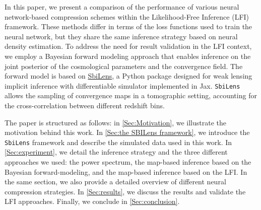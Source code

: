 \documentclass{aa}
\begin{document}
In this paper, we present a comparison of the performance of various neural network-based compression schemes within the Likelihood-Free Inference (LFI) framework. These methods differ in terms of the loss functions used to train the neural network, but they share the same inference strategy based on neural density estimation. To address the need for result validation in the LFI context, we employ a Bayesian forward modeling approach that enables inference on the joint posterior of the cosmological parameters and the convergence field. The forward model is based on \href{https://github.com/DifferentiableUniverseInitiative/sbi_lens}{\url{SbiLens}}, a Python package designed for weak lensing implicit inference with differentiable simulator implemented in Jax. \texttt{SbiLens} allows the sampling of convergence maps in a tomographic setting, accounting for the cross-correlation between different redshift bins.



The paper is structured as follows: in \autoref{Sec:Motivation}, we illustrate the motivation behind this work. In \autoref{Sec:the SBILens framework}, we introduce the \texttt{SbiLens} framework and describe the simulated data used in this work. In \autoref{Sec:experiment}, we detail the inference strategy and the three different approaches we used: the power spectrum, the map-based inference based on the Bayesian forward-modeling, and the map-based inference based on the LFI. In the same section, we also provide a detailed overview of different neural compression strategies. In \autoref{Sec:results}, we discuss the results and validate the LFI approaches. Finally, we conclude in \autoref{Sec:conclusion}. 
\end{document}
